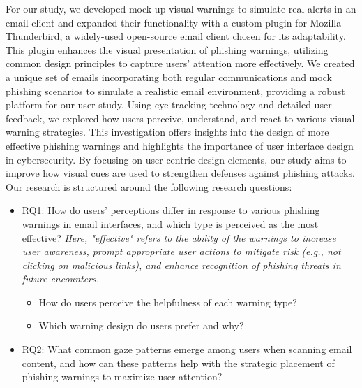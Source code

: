 \documentclass[
  a4paper,  %
  twoside,  %
  bibliography=totoc,
  headsepline,
  cleardoublepage=empty,
  parskip=half,
  draft=false
]{scrbook}
\begin{document}
For our study, we developed mock-up visual warnings to simulate real alerts in an email client and expanded their functionality with a custom plugin for Mozilla Thunderbird, a widely-used open-source email client chosen for its adaptability. This plugin enhances the visual presentation of phishing warnings, utilizing common design principles to capture users' attention more effectively. \newline
We created a unique set of emails incorporating both regular communications and mock phishing scenarios to simulate a realistic email environment, providing a robust platform for our user study. Using eye-tracking technology and detailed user feedback, we explored how users perceive, understand, and react to various visual warning strategies. This investigation offers insights into the design of more effective phishing warnings and highlights the importance of user interface design in cybersecurity. By focusing on user-centric design elements, our study aims to improve how visual cues are used to strengthen defenses against phishing attacks. Our research is structured around the following research questions:

\begin{itemize}
    \item RQ1: How do users' perceptions differ in response to various phishing warnings in email interfaces, and which type is perceived as the most effective? \textit{Here, "effective" refers to the ability of the warnings to increase user awareness, prompt appropriate user actions to mitigate risk (e.g., not clicking on malicious links), and enhance recognition of phishing threats in future encounters.}
        \begin{itemize}
            \item How do users perceive the helpfulness of each warning type?
        \end{itemize}
        \begin{itemize}
            \item Which warning design do users prefer and why?
        \end{itemize}
    \item RQ2: What common gaze patterns emerge among users when scanning email content, and how can these patterns help with the strategic placement of phishing warnings to maximize user attention?
\end{itemize}
\end{document}
